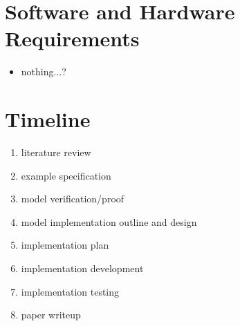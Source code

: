 \documentclass[12pt, a4paper]{article}
\begin{document}
\section*{Software and Hardware Requirements}

\begin{itemize}
  \item nothing$\ldots$?
\end{itemize}

\section*{Timeline}

\begin{enumerate}
  \item literature review
  \item example specification
  \item model verification/proof
  \item model implementation outline and design
  \item implementation plan
  \item implementation development
  \item implementation testing
  \item paper writeup
\end{enumerate}

\end{document}
